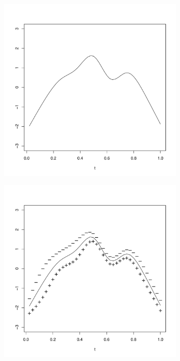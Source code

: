 \begin{figure}
	\begin{subfigure}
		[b]{0.32 
		\textwidth} \centering 
		\includegraphics[width=0.99 
		\textwidth]{Images-future-work/ef1.pdf} \caption{} \label{} 
	\end{subfigure}
	\begin{subfigure}
		[b]{0.32 
		\textwidth} \centering 
		\includegraphics[width=0.99 
		\textwidth]{Images-future-work/ef2pn.pdf} \caption{} \label{} 
	\end{subfigure}
	

\end{figure}
